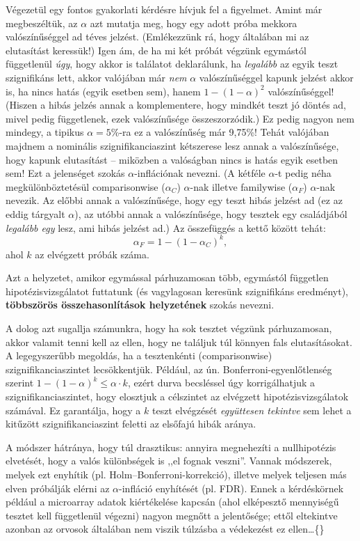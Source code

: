 \documentclass[]{book}
\begin{document}
Végezetül egy fontos gyakorlati kérdésre hívjuk fel a figyelmet. Amint már megbeszéltük, az \(\alpha\) azt mutatja meg, hogy egy adott próba mekkora valószínűséggel ad téves jelzést. (Emlékezzünk rá, hogy általában mi az elutasítást keressük!) Igen ám, de ha mi két próbát végzünk egymástól függetlenül \emph{úgy}, hogy akkor is találatot deklarálunk, ha \emph{legalább} az egyik teszt szignifikáns lett, akkor valójában már \emph{nem} \(\alpha\) valószínűséggel kapunk jelzést akkor is, ha nincs hatás (egyik esetben sem), hanem \(1-\left(1-\alpha\right)^2\) valószínűséggel! (Hiszen a hibás jelzés annak a komplementere, hogy mindkét teszt jó döntés ad, mivel pedig függetlenek, ezek valószínűsége összeszorzódik.) Ez pedig nagyon nem mindegy, a tipikus \(\alpha=5\)\%-ra ez a valószínűség már 9,75\%! Tehát valójában majdnem a nominális szignifikanciaszint kétszerese lesz annak a valószínűsége, hogy kapunk elutasítást -- miközben a valóságban nincs is hatás egyik esetben sem! Ezt a jelenséget szokás \(\alpha\)-inflációnak nevezni. (A kétféle \(\alpha\)-t pedig néha megkülönböztetésül comparisonwise (\(\alpha_C\)) \(\alpha\)-nak illetve familywise (\(\alpha_F\)) \(\alpha\)-nak nevezik. Az előbbi annak a valószínűsége, hogy egy teszt hibás jelzést ad (ez az eddig tárgyalt \(\alpha\)), az utóbbi annak a valószínűsége, hogy tesztek egy családjából \emph{legalább egy} lesz, ami hibás jelzést ad.) Az összefüggés a kettő között tehát:
\[
    \alpha_F = 1-\left(1-\alpha_C\right)^k,
\]
ahol \(k\) az elvégzett próbák száma.

Azt a helyzetet, amikor egymással párhuzamosan több, egymástól független hipotézisvizsgálatot futtatunk (és vagylagosan keresünk szignifikáns eredményt), \textbf{többszörös összehasonlítások helyzetének} szokás nevezni.

A dolog azt sugallja számunkra, hogy ha sok tesztet végzünk párhuzamosan, akkor valamit tenni kell az ellen, hogy ne találjuk túl könnyen fals elutasításokat. A legegyszerűbb megoldás, ha a tesztenkénti (comparisonwise) szignifikanciaszintet lecsökkentjük. Például, az ún. Bonferroni-egyenlőtlenség szerint \(1-\left(1-\alpha\right)^k\leq \alpha\cdot k\), ezért durva becsléssel úgy korrigálhatjuk a szignifikanciaszintet, hogy elosztjuk a célszintet az elvégzett hipotézisvizsgálatok számával. Ez garantálja, hogy a \(k\) teszt elvégzését \emph{együttesen tekintve} sem lehet a kitűzött szignifikanciaszint feletti az elsőfajú hibák aránya.

A módszer hátránya, hogy túl drasztikus: annyira megnehezíti a nullhipotézis elvetését, hogy a valós különbségek is ,,el fognak veszni''. Vannak módszerek, melyek ezt enyhítik (pl. Holm--Bonferroni-korrekció), illetve melyek teljesen más elven próbálják elérni az \(\alpha\)-infláció enyhítését (pl. FDR). Ennek a kérdéskörnek például a microarray adatok kiértékelése kapcsán (ahol elképesztő mennyiségű tesztet kell függetlenül végezni) nagyon megnőtt a jelentősége; ettől eltekintve azonban az orvosok általában nem viszik túlzásba a védekezést ez ellen\dots\{\}
\end{document}
